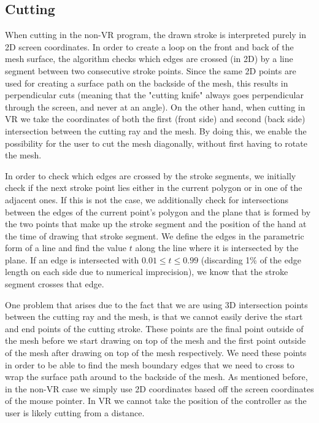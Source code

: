 \subsection{Cutting}
When cutting in the non-VR program, the drawn stroke is interpreted purely in 2D screen coordinates. In order to create a loop on the front and back of the mesh surface, the algorithm checks which edges are crossed (in 2D) by a line segment between two consecutive stroke points. Since the same 2D points are used for creating a surface path on the backside of the mesh, this results in perpendicular cuts (meaning that the "cutting knife" always goes perpendicular through the screen, and never at an angle). On the other hand, when cutting in VR we take the coordinates of both the first (front side) and second (back side) intersection between the cutting ray and the mesh. By doing this, we enable the possibility for the user to cut the mesh diagonally, without first having to rotate the mesh. 

In order to check which edges are crossed by the stroke segments, we initially check if the next stroke point lies either in the current polygon or in one of the adjacent ones. If this is not the case, we additionally check for intersections between the edges of the current point's polygon and the plane that is formed by the two points that make up the stroke segment and the position of the hand at the time of drawing that stroke segment. We define the edges in the parametric form of a line and find the value $t$ along the line where it is intersected by the plane. If an edge is intersected with $ 0.01 \leq t \leq 0.99$ (discarding 1\% of the edge length on each side due to numerical imprecision), we know that the stroke segment crosses that edge.

One problem that arises due to the fact that we are using 3D intersection points between the cutting ray and the mesh, is that we cannot easily derive the start and end points of the cutting stroke. These points are the final point outside of the mesh before we start drawing on top of the mesh and the first point outside of the mesh after drawing on top of the mesh respectively. We need these points in order to be able to find the mesh boundary edges that we need to cross to wrap the surface path around to the backside of the mesh. As mentioned before, in the non-VR case we simply use 2D coordinates based off the screen coordinates of the mouse pointer. In VR we cannot take the position of the controller as the user is likely cutting from a distance. 

